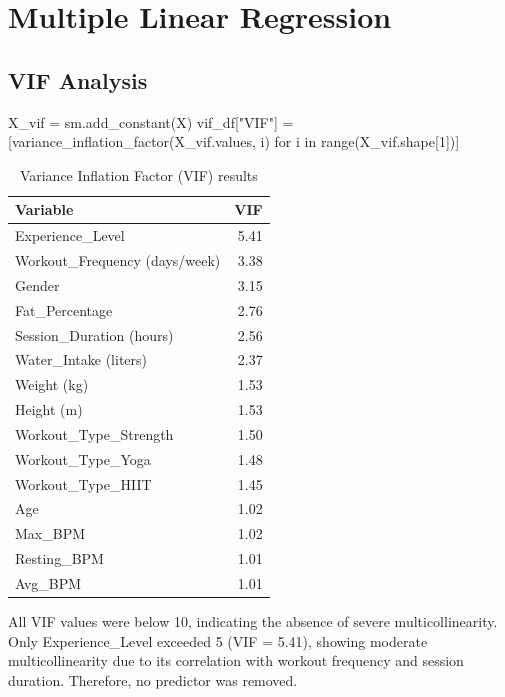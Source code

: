 \documentclass[12pt,a4paper]{report}
\begin{document}
\chapter{Multiple Linear Regression}
\section{VIF Analysis}
\begin{code}
X_vif = sm.add_constant(X)
vif_df["VIF"] = [variance_inflation_factor(X_vif.values, i) for i in range(X_vif.shape[1])]
\end{code}
\begin{table}[H]
\centering
\begin{tabular}{lr}
\toprule
\textbf{Variable} & \textbf{VIF}\\
\midrule
Experience\_Level & 5.41\\
Workout\_Frequency (days/week) & 3.38\\
Gender & 3.15\\
Fat\_Percentage & 2.76\\
Session\_Duration (hours) & 2.56\\
Water\_Intake (liters) & 2.37\\
Weight (kg) & 1.53\\
Height (m) & 1.53\\
Workout\_Type\_Strength & 1.50\\
Workout\_Type\_Yoga & 1.48\\
Workout\_Type\_HIIT & 1.45\\
Age & 1.02\\
Max\_BPM & 1.02\\
Resting\_BPM & 1.01\\
Avg\_BPM & 1.01\\
\bottomrule
\end{tabular}
\caption{Variance Inflation Factor (VIF) results}
\end{table}
All VIF values were below 10, indicating the absence of severe multicollinearity. Only Experience\_Level exceeded 5 (VIF = 5.41), showing moderate multicollinearity due to its correlation with workout frequency and session duration. Therefore, no predictor was removed.
\end{document}
